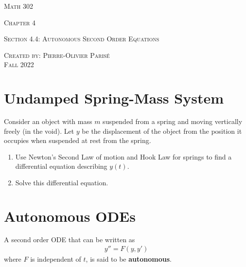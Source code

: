 \documentclass[12pt,a4paper]{article}
\newcounter{example}[section]
\begin{document}
\thispagestyle{empty}

\begin{center}
\vspace*{2.5cm}

{\Huge \textsc{Math 302}}

\vspace*{2cm}

{\LARGE \textsc{Chapter 4}} 

\vspace*{0.75cm}

\noindent\textsc{Section 4.4: Autonomous Second Order Equations}

\vspace*{0.75cm}

\tableofcontents

\vfill

\noindent \textsc{Created by: Pierre-Olivier Paris{\'e}} \\
\textsc{Fall 2022}
\end{center}

\newpage

\section{Undamped Spring-Mass System}

\begin{example}
Consider an object with mass $m$ suspended from a spring and moving vertically freely (in the void). Let $y$ be the displacement of the object from the position it occupies when suspended at rest from the spring. \begin{enumerate}
\item Use Newton's Second Law of motion and Hook Law for springs to find a differential equation describing $y(t)$.
\item Solve this differential equation.
\end{enumerate}
\end{example}

\newpage

\phantom{1}

\newpage

\section{Autonomous ODEs}
A second order ODE that can be written as
	\begin{align}
	y'' = F (y, y') \label{Eq:AutonomousODE}
	\end{align}
where $F$ is independent of $t$, is said to be \textbf{autonomous}.
\end{document}
